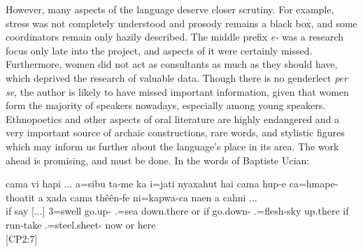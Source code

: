 
However, many aspects of the language deserve closer scrutiny. For example, stress was not completely understood and prosody remains a black box, and some coordinators remain only hazily described. The middle prefix \textit{e-} was a research focus only late into the project, and aspects of it were certainly missed. Furthermore, women did not act as consultants as much as they should have, which deprived the research of valuable data. Though there is no genderlect \textit{per se}, the author is likely to have missed important information, given that women form the majority of speakers nowadays, especially among young speakers. Ethnopoetics and other aspects of oral literature are highly endangered and a very important source of archaic constructions, rare words, and stylistic figures which may inform us further about the language's place in its area. The work ahead is promising, and must be done. In the words of Baptiste Ucian:
 
 
 \ea
 \gll cama vi hapi {\ob}...{\cb} a=sibu ta-me ka i=jati nyaxahut hai cama hup-e ca=hmape-thoatit a xada cama thêên-fe ni=kapwa-ca naen a cahni ...\\
if say  [...] 3=swell go.up-  .=sea down.there or if go.down- .=flesh-sky  up.there if run-take .=steel.sheet- now or here\\
 \glt {} {[CP2:7]}
\z
 
